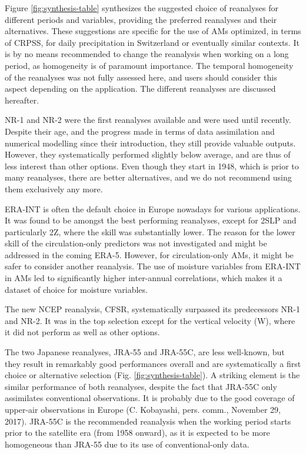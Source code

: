\documentclass[smallextended]{svjour3}       %
\begin{document}
	Figure \ref{fig:synthesis-table} synthesizes the suggested choice of reanalyses for different periods and variables, providing the preferred reanalyses and their alternatives. These suggestions are specific for the use of AMs optimized, in terms of CRPSS, for daily precipitation in Switzerland or eventually similar contexts. It is by no means recommended to change the reanalysis when working on a long period, as homogeneity is of paramount importance. The temporal homogeneity of the reanalyses was not fully assessed here, and users should consider this aspect depending on the application. The different reanalyses are discussed hereafter.
	
	NR-1 and NR-2 were the first reanalyses available and were used until recently. Despite their age, and the progress made in terms of data assimilation and numerical modelling since their introduction, they still provide valuable outputs. However, they systematically performed slightly below average, and are thus of less interest than other options. Even though they start in 1948, which is prior to many reanalyses, there are better alternatives, and we do not recommend using them exclusively any more.
	
	ERA-INT is often the default choice in Europe nowadays for various applications. It was found to be amongst the best performing reanalyses, except for 2SLP and particularly 2Z, where the skill was substantially lower. The reason for the lower skill of the circulation-only predictors was not investigated and might be addressed in the coming ERA-5. However, for circulation-only AMs, it might be safer to consider another reanalysis. The use of moisture variables from ERA-INT in AMs led to significantly higher inter-annual correlations, which makes it a dataset of choice for moisture variables.
	
	The new NCEP reanalysis, CFSR, systematically surpassed its predecessors NR-1 and NR-2. It was in the top selection except for the vertical velocity (W), where it did not perform as well as other options.
	
	The two Japanese reanalyses, JRA-55 and JRA-55C, are less well-known, but they result in remarkably good performances overall and are systematically a first choice or alternative selection (Fig. \ref{fig:synthesis-table}). A striking element is the similar performance of both reanalyses, despite the fact that JRA-55C only assimilates conventional observations. It is probably due to the good coverage of upper-air observations in Europe (C. Kobayashi, pers. comm., November 29, 2017). JRA-55C is the recommended reanalysis when the working period starts prior to the satellite era (from 1958 onward), as it is expected to be more homogeneous than JRA-55 due to its use of conventional-only data.
	
\end{document}
